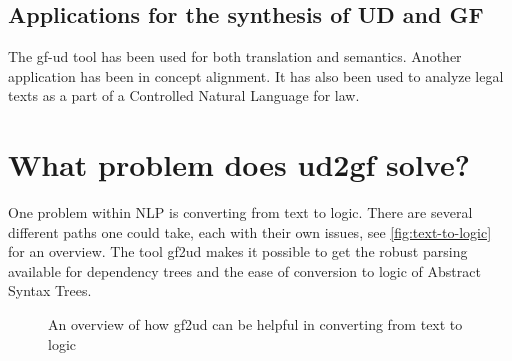 


\subsection{Applications for the synthesis of UD and GF}

The gf-ud tool has been used for both translation and semantics\cite{ranta-al-2020}. %
Another application has been in concept alignment\cite{masciolini-ranta-2021}.
It has also been used to analyze legal texts as a part of a Controlled Natural Language for law\cite{listenmaa-etal-2021-towards}.

\section{What problem does ud2gf solve?}
% 
% 

One problem within NLP is converting from text to logic. There are several different paths one could take, each with their own issues, see \autoref{fig:text-to-logic} for an overview. The tool gf2ud makes it possible to get the robust parsing available for dependency trees and the ease of conversion to logic of Abstract Syntax Trees.

\begin{figure}[H]
    \centering
    \caption{An overview of how gf2ud can be helpful in converting from text to logic}
    \label{fig:text-to-logic}
\end{figure}

